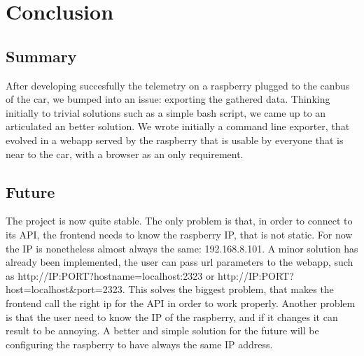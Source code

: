 \section{\huge{Conclusion}}

\subsection{Summary}
After developing succesfully the telemetry on a raspberry plugged to the canbus of the car, we bumped into an issue: exporting the gathered data.
Thinking initially to trivial solutions such as a simple bash script, we came up to an articulated an better solution. We wrote initially
a command line exporter, that evolved in a webapp served by the raspberry that is usable by everyone that is near to the car, with a browser
as an only requirement. 

\subsection{Future}
The project is now quite stable. The only problem is that, in order to connect to its API, the frontend needs to know the raspberry IP, 
that is not static. For now the IP is nonetheless almost always the same: 192.168.8.101. A minor solution has already been implemented,
the user can pass url parameters to the webapp, such as http://IP:PORT?hostname=localhost:2323 or http://IP:PORT?host=localhost\&port=2323.
This solves the biggest problem, that makes the frontend call the right ip for the API in order to work properly. Another problem is that
the user need to know the IP of the raspberry, and if it changes it can result to be annoying. A better and simple solution for the future
will be configuring the raspberry to have always the same IP address.